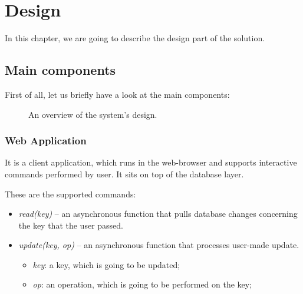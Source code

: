 \chapter{Design}
\label{Design}

In this chapter, we are going to describe the design part of the solution.

\section{Main components}

First of all, let us briefly have a look at the main components:

\begin{figure}[!htb]
    \setlength{\fboxsep}{4pt}%
    \setlength{\fboxrule}{1pt}%
    \caption{An overview of the system's design.}
    \label{fig:design1}
  \end{figure}

\subsection*{Web Application}

It is a client application, which runs in the web-browser and supports interactive commands performed by user. It sits on top of the database layer.

\vspace{5mm}These are the supported commands:

\begin{itemize}
    \item \textit{read(key)} -- an asynchronous function that pulls database changes concerning the key that the user passed.
    \item \textit{update(key, op)}  -- an asynchronous function that processes user-made update.
     \begin{itemize}
         \item \textit{key}: a key, which is going to be updated;
         \item \textit{op}: an operation, which is going to be performed on the key;
     \end{itemize}
  \end{itemize}

